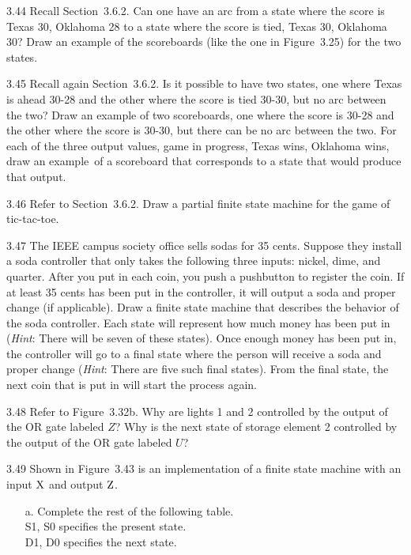\documentclass{patt}
\begin{document}
\begin{exercises}
\item[3.44] Recall Section~3.6.2. Can one have an arc from
  a state where the score is Texas 30, Oklahoma 28 to a state where
  the score is tied, Texas 30, Oklahoma 30?  Draw an example of the
  scoreboards (like the one in Figure~3.25) for the two states.

\item[3.45] Recall again Section~3.6.2. Is it possible to
  have two states, one where Texas is ahead 30-28 and the other where
  the score is tied 30-30, but no arc between the two?  Draw an
  example of two scoreboards, one where the score is 30-28 and the
  other where the score is 30-30, but there can be no arc between the
  two. For each of the three output values, game in progress, Texas
  wins, Oklahoma wins, draw an example~of a scoreboard that
  corresponds to a state that would produce that output.


\item[3.46] Refer to Section~3.6.2. Draw a partial finite
  state machine for the game of tic-tac-toe.

\item[3.47] The IEEE campus society office sells sodas for 35 cents.
  Suppose they install a soda controller that only takes the following
  three inputs: nickel, dime, and quarter. After you put in each coin,
  you push a pushbutton to register the coin. If at least 35 cents has
  been put in the controller, it will output a soda and proper change
  (if applicable). Draw a finite state machine that describes the
  behavior of the soda controller. Each state will represent how much
  money has been put in ({\it Hint}: There will be seven of these
  states). Once enough money has been put in, the controller will go
  to a final state where the person will receive a soda and proper
  change ({\it Hint}: There are five such final states). From the
  final state, the next coin that is put in will start the process
  again.


\item[3.48] Refer to Figure~3.32b. Why are lights 1 and 2 controlled
  by the output of the OR gate labeled $Z$? Why is the next state of
  storage element 2 controlled by the output of the OR gate labeled
  $U$?


\newpage

\item[3.49] Shown in Figure~3.43 is an implementation of a finite
  state machine with an input $\rm X$ and output $\rm Z$.

\begin{enumerate}[b.]
\item[a.] Complete the rest of the following table.\\
  S1, S0 specifies the present state.\\
  D1, D0 specifies the next state.


\end{enumerate}
\end{exercises}
\end{document}
